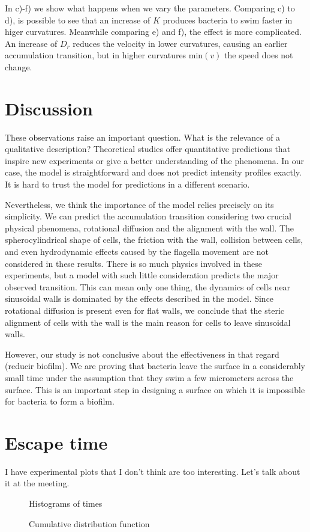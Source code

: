 In c)-f) we show what happens when we vary the parameters. Comparing c) to d), is possible to see that an increase of $K$ produces bacteria to swim faster in higer curvatures. Meanwhile comparing e) and f), the effect is more complicated. An increase of $D_r$ reduces the velocity in lower curvatures, causing an earlier accumulation transition, but in higher curvatures $\text{min}(v)$ the speed does not change.

\section{Discussion}

These observations raise an important question. What is the relevance of a qualitative description? Theoretical studies offer quantitative predictions that inspire new experiments or give a better understanding of the phenomena. In our case, the model is straightforward and does not predict intensity profiles exactly. It is hard to trust the model for predictions in a different scenario.

Nevertheless, we think the importance of the model relies precisely on its simplicity. We can predict the accumulation transition considering two crucial physical phenomena, rotational diffusion and the alignment with the wall. The spherocylindrical shape of cells, the friction with the wall, collision between cells, and even hydrodynamic effects caused by the flagella movement are not considered in these results. There is so much physics involved in these experiments, but a model with such little consideration predicts the major observed transition. This can mean only one thing, the dynamics of cells near sinusoidal walls is dominated by the effects described in the model. Since rotational diffusion is present even for flat walls, we conclude that the steric alignment of cells with the wall is the main reason for cells to leave sinusoidal walls. 

However, our study is not conclusive about the effectiveness in that regard (reducir biofilm). We are proving that bacteria leave the surface in a considerably small time under the assumption that they swim a few micrometers across the surface. This is an important step in designing a surface on which it is impossible for bacteria to form a biofilm.

\newpage

\section{Escape time}

I have experimental plots that I don't think are too interesting. Let's talk about it at the meeting.


\begin{figure}
	\centering
	
	\caption[]{Histograms  of times}	
	\label{t1}
\end{figure}


\begin{figure}
	\centering
	
	\caption[]{Cumulative distribution function  }	
	\label{t1}
\end{figure}
